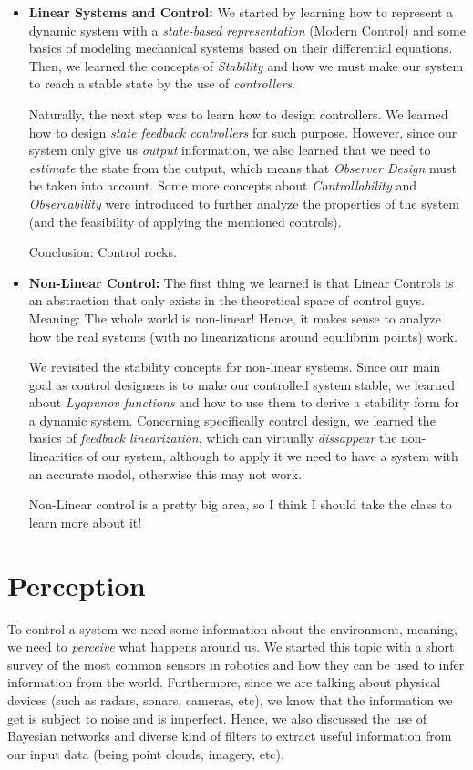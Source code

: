 \documentclass[10pt,a4paper]{article}
\begin{document}
\begin{itemize}
\item{\textbf{Linear Systems and Control:} We started by learning how to represent a dynamic system with a \textit{state-based representation}} (Modern Control) and some basics of modeling mechanical systems based on their differential equations. Then, we learned the concepts of \textit{Stability} and how we must make our system to reach a stable state by the use of \textit{controllers}.
\medskip

Naturally, the next step was to learn how to design controllers. We learned how to design \textit{state feedback controllers} for such purpose. However, since our system only give us \textit{output} information, we also learned that we need to \textit{estimate} the state from the output, which means that \textit{Observer Design} must be taken into account. Some more concepts about \textit{Controllability} and \textit{Observability} were introduced to further analyze the properties of the system (and the feasibility of applying the mentioned controls).
\medskip

Conclusion: Control rocks.

\item{\textbf{Non-Linear Control:} }
The first thing we learned is that Linear Controls is an abstraction that only exists in the theoretical space of control guys. Meaning: The whole world is non-linear! Hence, it makes sense to analyze how the real systems (with no linearizations around equilibrim points) work.
\medskip

We revisited the stability concepts for non-linear systems. Since our main goal as control designers is to make our controlled system stable, we learned about \textit{Lyapunov functions} and how to use them to derive a stability form for a dynamic system. Concerning specifically control design, we learned the basics of \textit{feedback linearization}, which can virtually \textit{dissappear} the non-linearities of our system, although to apply it we need to have a system with an accurate model, otherwise this may not work.
\medskip

Non-Linear control is a pretty big area, so I think I should take the class to learn more about it!

\end{itemize}


\section{Perception}
To control a system we need some information about the environment, meaning, we need to \textit{perceive} what happens around us. We started this topic with a short survey of the most common sensors in robotics and how they can be used to infer information from the world. Furthermore, since we are talking about physical devices (such as radars, sonars, cameras, etc), we know that the information we get is subject to noise and is imperfect. Hence, we also discussed the use of Bayesian networks and diverse kind of filters to extract useful information from our input data (being point clouds, imagery, etc).
\medskip
\end{document}
